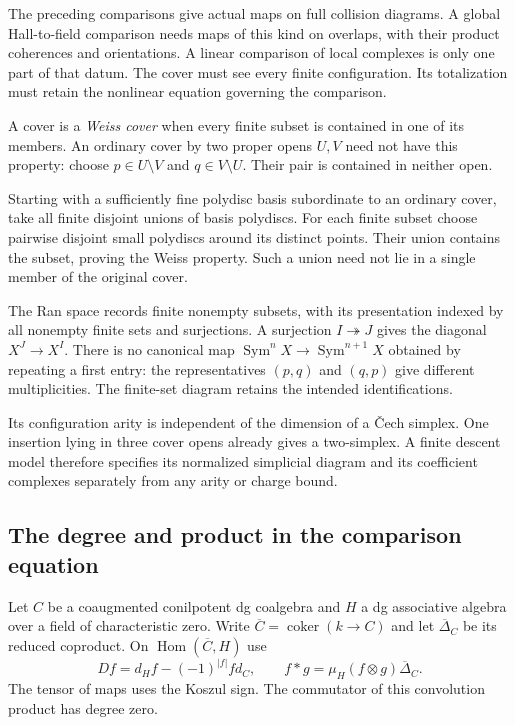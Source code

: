 The preceding comparisons give actual maps on full collision
diagrams. A global Hall-to-field comparison needs maps of this kind
on overlaps, with their product coherences and orientations. A
linear comparison of local complexes is only one part of that datum.
The cover must see every finite configuration. Its totalization
must retain the nonlinear equation governing the comparison.

A cover is a \emph{Weiss cover} when every finite subset is contained
in one of its members. An ordinary cover by two proper opens $U,V$
need not have this property: choose $p\in U\setminus V$ and
$q\in V\setminus U$. Their pair is contained in neither open.

Starting with a sufficiently fine polydisc basis subordinate to an
ordinary cover, take all finite disjoint unions of basis polydiscs.
For each finite subset choose pairwise disjoint small polydiscs
around its distinct points. Their union contains the subset, proving
the Weiss property. Such a union need not lie in a single member
of the original cover.

The Ran space records finite nonempty subsets, with its presentation
indexed by all nonempty finite sets and surjections. A surjection
$I\twoheadrightarrow J$ gives the diagonal $X^J\to X^I$.
There is no canonical map $\operatorname{Sym}^nX\to
\operatorname{Sym}^{n+1}X$ obtained by repeating a first entry:
the representatives $(p,q)$ and $(q,p)$ give different multiplicities.
The finite-set diagram retains the intended identifications.

Its configuration arity is independent of the dimension of a
\v Cech simplex. One insertion lying in three cover opens already
gives a two-simplex. A finite descent model therefore specifies
its normalized simplicial diagram and its coefficient complexes
separately from any arity or charge bound.

\subsection{The degree and product in the comparison equation}

Let $C$ be a coaugmented conilpotent dg coalgebra and $H$ a dg
associative algebra over a field of characteristic zero. Write
$\overline C=\operatorname{coker}(k\to C)$ and let
$\overline\Delta_C$ be its reduced coproduct. On
$\operatorname{Hom}(\overline C,H)$ use
\[
 Df=d_Hf-(-1)^{|f|}fd_C,
 \qquad f*g=\mu_H(f\otimes g)\overline\Delta_C.
\]
The tensor of maps uses the Koszul sign. The commutator of this
convolution product has degree zero.

